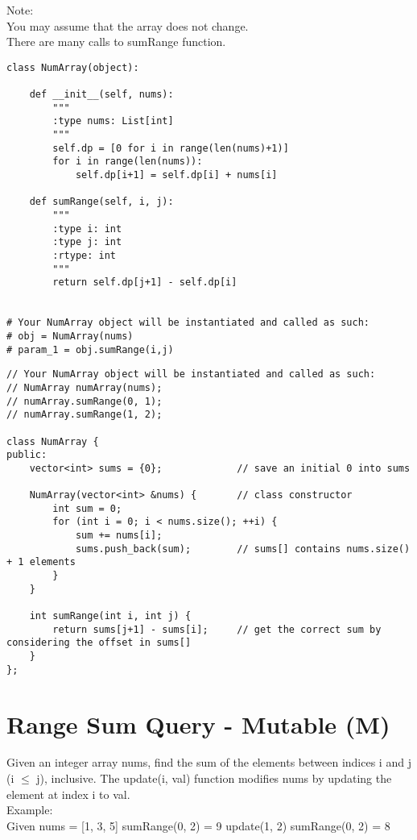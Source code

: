 Note:\\
    You may assume that the array does not change.\\
    There are many calls to sumRange function.\\

\begin{lstlisting}
class NumArray(object):

    def __init__(self, nums):
        """
        :type nums: List[int]
        """
        self.dp = [0 for i in range(len(nums)+1)]
        for i in range(len(nums)):
            self.dp[i+1] = self.dp[i] + nums[i]

    def sumRange(self, i, j):
        """
        :type i: int
        :type j: int
        :rtype: int
        """
        return self.dp[j+1] - self.dp[i]


# Your NumArray object will be instantiated and called as such:
# obj = NumArray(nums)
# param_1 = obj.sumRange(i,j)
\end{lstlisting}


\begin{lstlisting}
// Your NumArray object will be instantiated and called as such:
// NumArray numArray(nums);
// numArray.sumRange(0, 1);
// numArray.sumRange(1, 2);

class NumArray {
public:
    vector<int> sums = {0};             // save an initial 0 into sums
    
    NumArray(vector<int> &nums) {       // class constructor
        int sum = 0;
        for (int i = 0; i < nums.size(); ++i) {
            sum += nums[i];
            sums.push_back(sum);        // sums[] contains nums.size() + 1 elements
        }
    }
    
    int sumRange(int i, int j) {
        return sums[j+1] - sums[i];     // get the correct sum by considering the offset in sums[]
    }
};
\end{lstlisting}


\section{Range Sum Query - Mutable (M)}
Given an integer array nums, find the sum of the elements between indices i and j (i $\leq$ j), inclusive. The update(i, val) function modifies nums by updating the element at index i to val. \\

Example: \\
Given nums = [1, 3, 5]
sumRange(0, 2) = 9
update(1, 2)
sumRange(0, 2) = 8

